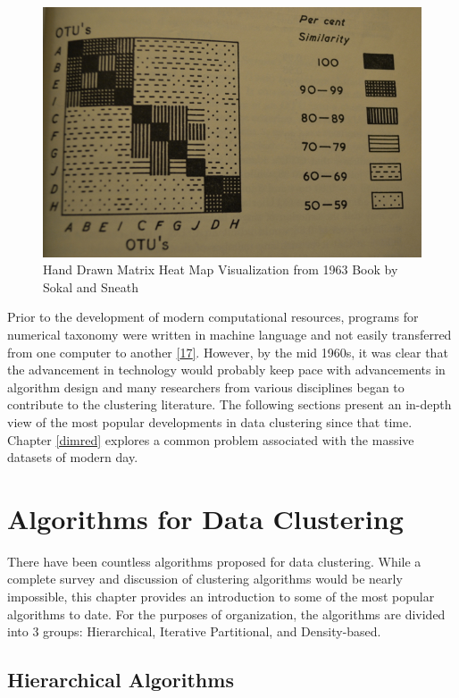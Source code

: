 \documentclass[
]{article}
\theoremstyle{definition}
\theoremstyle{definition}
\theoremstyle{definition}
\theoremstyle{definition}
\theoremstyle{remark}
\begin{document}
\begin{figure}

{\centering \includegraphics[width=0.5\linewidth]{figs/sneathheatmap} 

}

\caption{Hand Drawn Matrix Heat Map Visualization from 1963 Book by Sokal and Sneath}\label{fig:sneathheatmap}
\end{figure}

Prior to the development of modern computational resources, programs for numerical taxonomy were written in machine language and not easily transferred from one computer to another \protect\hyperlink{ref-sokal}{{[}17{]}}. However, by the mid 1960s, it was clear that the advancement in technology would probably keep pace with advancements in algorithm design and many researchers from various disciplines began to contribute to the clustering literature. The following sections present an in-depth view of the most popular developments in data clustering since that time. Chapter \ref{dimred} explores a common problem associated with the massive datasets of modern day.

\hypertarget{clusteralgos}{%
\section{Algorithms for Data Clustering}\label{clusteralgos}}

There have been countless algorithms proposed for data clustering. While a complete survey and discussion of clustering algorithms would be nearly impossible, this chapter provides an introduction to some of the most popular algorithms to date. For the purposes of organization, the algorithms are divided into 3 groups: Hierarchical, Iterative Partitional, and Density-based.

\hypertarget{hc}{%
\subsection{Hierarchical Algorithms}\label{hc}}
\end{document}
